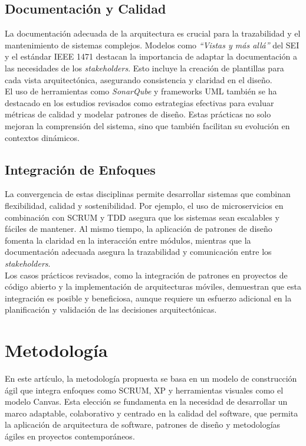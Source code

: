 \documentclass[conference]{IEEEtran}
\begin{document}
\subsection{Documentación y Calidad}
La documentación adecuada de la arquitectura es crucial para la trazabilidad y el mantenimiento de sistemas complejos. Modelos como \textit{``Vistas y más allá''} del SEI y el estándar IEEE 1471 destacan la importancia de adaptar la documentación a las necesidades de los \textit{stakeholders}. Esto incluye la creación de plantillas para cada vista arquitectónica, asegurando consistencia y claridad en el diseño.\\

El uso de herramientas como \textit{SonarQube} y frameworks UML también se ha destacado en los estudios revisados como estrategias efectivas para evaluar métricas de calidad y modelar patrones de diseño. Estas prácticas no solo mejoran la comprensión del sistema, sino que también facilitan su evolución en contextos dinámicos.\\

\subsection{Integración de Enfoques}
La convergencia de estas disciplinas permite desarrollar sistemas que combinan flexibilidad, calidad y sostenibilidad. Por ejemplo, el uso de microservicios en combinación con SCRUM y TDD asegura que los sistemas sean escalables y fáciles de mantener. Al mismo tiempo, la aplicación de patrones de diseño fomenta la claridad en la interacción entre módulos, mientras que la documentación adecuada asegura la trazabilidad y comunicación entre los \textit{stakeholders}.\\

Los casos prácticos revisados, como la integración de patrones en proyectos de código abierto y la implementación de arquitecturas móviles, demuestran que esta integración es posible y beneficiosa, aunque requiere un esfuerzo adicional en la planificación y validación de las decisiones arquitectónicas.\\

\section{Metodología}
En este artículo, la metodología propuesta se basa en un modelo de construcción ágil que integra enfoques como SCRUM, XP y herramientas visuales como el modelo Canvas. Esta elección se fundamenta en la necesidad de desarrollar un marco adaptable, colaborativo y centrado en la calidad del software, que permita la aplicación de arquitectura de software, patrones de diseño y metodologías ágiles en proyectos contemporáneos.\\
\end{document}
